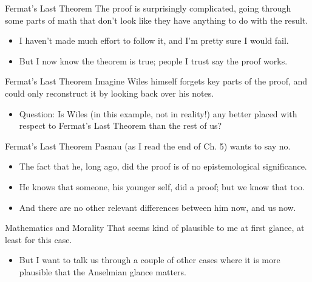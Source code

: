 \documentclass[
  17pt,
  letterpaper,
  ignorenonframetext,
  aspectratio=169,
  handout]{beamer}
\providecommand{\tightlist}{%
  \setlength{\itemsep}{0pt}\setlength{\parskip}{0pt}}\usepackage{longtable,booktabs,array}
\begin{document}
\begin{frame}{Fermat's Last Theorem}
\protect\hypertarget{fermats-last-theorem-1}{}
The proof is surprisingly complicated, going through some parts of math
that don't look like they have anything to do with the result.

\begin{itemize}[<+->]
\tightlist
\item
  I haven't made much effort to follow it, and I'm pretty sure I would
  fail.
\item
  But I now know the theorem is true; people I trust say the proof
  works.
\end{itemize}
\end{frame}

\begin{frame}{Fermat's Last Theorem}
\protect\hypertarget{fermats-last-theorem-2}{}
Imagine Wiles himself forgets key parts of the proof, and could only
reconstruct it by looking back over his notes.

\begin{itemize}[<+->]
\tightlist
\item
  Question: Is Wiles (in this example, not in reality!) any better
  placed with respect to Fermat's Last Theorem than the rest of us?
\end{itemize}
\end{frame}

\begin{frame}{Fermat's Last Theorem}
\protect\hypertarget{fermats-last-theorem-3}{}
Pasnau (as I read the end of Ch. 5) wants to say no.

\begin{itemize}[<+->]
\tightlist
\item
  The fact that he, long ago, did the proof is of no epistemological
  significance.
\item
  He knows that someone, his younger self, did a proof; but we know that
  too.
\item
  And there are no other relevant differences between him now, and us
  now.
\end{itemize}
\end{frame}

\begin{frame}{Mathematics and Morality}
\protect\hypertarget{mathematics-and-morality}{}
That seems kind of plausible to me at first glance, at least for this
case.

\begin{itemize}[<+->]
\tightlist
\item
  But I want to talk us through a couple of other cases where it is more
  plausible that the Anselmian glance matters.
\end{itemize}
\end{frame}
\end{document}
